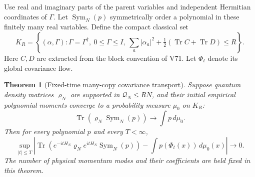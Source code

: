 \documentclass[11pt]{article}
\newtheorem{theorem}{Theorem}[section]
\theoremstyle{remark}
\begin{document}
Use real and imaginary parts of the parent variables
and independent Hermitian coordinates of \(\Gamma\).
Let \(\operatorname{Sym}_N(p)\) symmetrically order a
polynomial in these finitely many real variables.
Define the compact classical set
\[
 K_R=\left\{(\alpha,\Gamma):
  \Gamma=\Gamma^\dagger,\ 0\leq\Gamma\leq I,\
  \sum_a|\alpha_a|^2+
       \tfrac12(\operatorname{Tr}C+\operatorname{Tr}D)\leq R\right\}.
\]
Here \(C,D\) are extracted from the block convention
of V71.  Let \(\Phi_t\) denote its global covariance flow.

\begin{theorem}[Fixed-time many-copy covariance transport]
\label{thm:v20v72-transport}
Suppose quantum density matrices \(\varrho_N\) are
supported in \(\mathcal Q_N\leq RN\), and their initial
empirical polynomial moments converge to a probability
measure \(\mu_0\) on \(K_R\):
\[
 \operatorname{Tr}(\varrho_N\operatorname{Sym}_N(p))
                               \longrightarrow\int p\,d\mu_0 .
\]
Then for every polynomial \(p\) and every \(T<\infty\),
\[
 \sup_{|t|\leq T}
 \left|\operatorname{Tr}(e^{-itH_N}\varrho_Ne^{itH_N}
                                      \operatorname{Sym}_N(p))
                -\int p(\Phi_t(x))\,d\mu_0(x)\right|\longrightarrow0.
\]
The number of physical momentum modes and their
coefficients are held fixed in this theorem.
\end{theorem}
\end{document}
